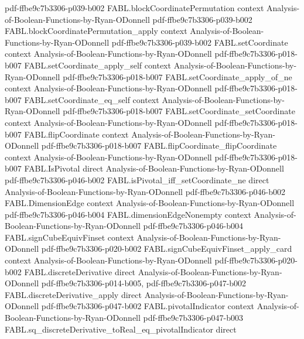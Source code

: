 \begin{theorem}
  {pdf-ffbe9c7b3306-p039-b002}
\proofstep
  {FABL.blockCoordinatePermutation}
  {context}
  {Analysis-of-Boolean-Functions-by-Ryan-ODonnell}
  {pdf-ffbe9c7b3306-p039-b002}
\proofstep
  {FABL.blockCoordinatePermutation_apply}
  {context}
  {Analysis-of-Boolean-Functions-by-Ryan-ODonnell}
  {pdf-ffbe9c7b3306-p039-b002}
\proofstep
  {FABL.setCoordinate}
  {context}
  {Analysis-of-Boolean-Functions-by-Ryan-ODonnell}
  {pdf-ffbe9c7b3306-p018-b007}
\proofstep
  {FABL.setCoordinate_apply_self}
  {context}
  {Analysis-of-Boolean-Functions-by-Ryan-ODonnell}
  {pdf-ffbe9c7b3306-p018-b007}
\proofstep
  {FABL.setCoordinate_apply_of_ne}
  {context}
  {Analysis-of-Boolean-Functions-by-Ryan-ODonnell}
  {pdf-ffbe9c7b3306-p018-b007}
\proofstep
  {FABL.setCoordinate_eq_self}
  {context}
  {Analysis-of-Boolean-Functions-by-Ryan-ODonnell}
  {pdf-ffbe9c7b3306-p018-b007}
\proofstep
  {FABL.setCoordinate_setCoordinate}
  {context}
  {Analysis-of-Boolean-Functions-by-Ryan-ODonnell}
  {pdf-ffbe9c7b3306-p018-b007}
\proofstep
  {FABL.flipCoordinate}
  {context}
  {Analysis-of-Boolean-Functions-by-Ryan-ODonnell}
  {pdf-ffbe9c7b3306-p018-b007}
\proofstep
  {FABL.flipCoordinate_flipCoordinate}
  {context}
  {Analysis-of-Boolean-Functions-by-Ryan-ODonnell}
  {pdf-ffbe9c7b3306-p018-b007}
\proofstep
  {FABL.IsPivotal}
  {direct}
  {Analysis-of-Boolean-Functions-by-Ryan-ODonnell}
  {pdf-ffbe9c7b3306-p046-b002}
\proofstep
  {FABL.isPivotal_iff_setCoordinate_ne}
  {direct}
  {Analysis-of-Boolean-Functions-by-Ryan-ODonnell}
  {pdf-ffbe9c7b3306-p046-b002}
\proofstep
  {FABL.DimensionEdge}
  {context}
  {Analysis-of-Boolean-Functions-by-Ryan-ODonnell}
  {pdf-ffbe9c7b3306-p046-b004}
\proofstep
  {FABL.dimensionEdgeNonempty}
  {context}
  {Analysis-of-Boolean-Functions-by-Ryan-ODonnell}
  {pdf-ffbe9c7b3306-p046-b004}
\proofstep
  {FABL.signCubeEquivFinset}
  {context}
  {Analysis-of-Boolean-Functions-by-Ryan-ODonnell}
  {pdf-ffbe9c7b3306-p020-b002}
\proofstep
  {FABL.signCubeEquivFinset_apply_card}
  {context}
  {Analysis-of-Boolean-Functions-by-Ryan-ODonnell}
  {pdf-ffbe9c7b3306-p020-b002}
\proofstep
  {FABL.discreteDerivative}
  {direct}
  {Analysis-of-Boolean-Functions-by-Ryan-ODonnell}
  {pdf-ffbe9c7b3306-p014-b005,
    pdf-ffbe9c7b3306-p047-b002}
\proofstep
  {FABL.discreteDerivative_apply}
  {direct}
  {Analysis-of-Boolean-Functions-by-Ryan-ODonnell}
  {pdf-ffbe9c7b3306-p047-b002}
\proofstep
  {FABL.pivotalIndicator}
  {context}
  {Analysis-of-Boolean-Functions-by-Ryan-ODonnell}
  {pdf-ffbe9c7b3306-p047-b003}
\proofstep
  {FABL.sq_discreteDerivative_toReal_eq_pivotalIndicator}
  {direct}

\end{theorem}
